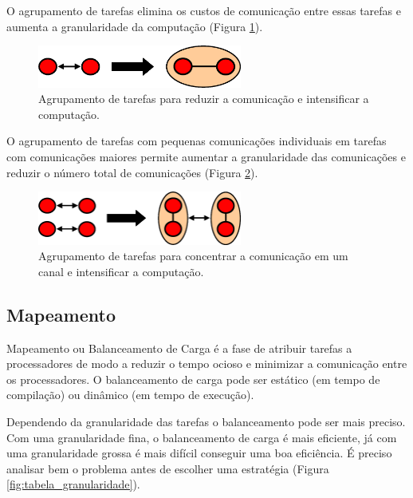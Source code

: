 O agrupamento de tarefas elimina os custos de comunicação entre essas tarefas e aumenta a granularidade da computação (Figura \ref{fig:granularidade_computacao}).

\begin{figure}[htbp]
	\centering
	\includegraphics[width=0.6\textwidth]{fig/granularidade_computacao.png}
	\caption{Agrupamento de tarefas para reduzir a comunicação e intensificar a computação.} 
	\label{fig:granularidade_computacao}
\end{figure}

O agrupamento de tarefas com pequenas comunicações individuais em tarefas com comunicações maiores permite aumentar a granularidade das comunicações e reduzir o número total de comunicações (Figura \ref{fig:granularidade_comunicacao}).

\begin{figure}[htbp]
	\centering
	\includegraphics[width=0.6\textwidth]{fig/granularidade_comunicacao.png}
	\caption{Agrupamento de tarefas para concentrar a comunicação em um canal e intensificar a computação.} 
	\label{fig:granularidade_comunicacao}
\end{figure}

\subsection{Mapeamento}

Mapeamento ou Balanceamento de Carga é a fase de atribuir tarefas a processadores de modo a reduzir o tempo ocioso e minimizar a comunicação entre os processadores. O balanceamento de carga pode ser estático (em tempo de compilação) ou dinâmico (em tempo de execução).

Dependendo da granularidade das tarefas o balanceamento pode ser mais preciso. Com uma granularidade fina, o balanceamento de carga é mais eficiente, já com uma granularidade grossa é mais difícil conseguir uma boa eficiência. É preciso analisar bem o problema antes de escolher uma estratégia (Figura \ref{fig:tabela_granularidade}).

